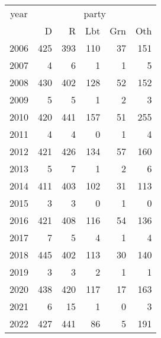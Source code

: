 \footnotesize\begin{tabular}[t]{lrrrrr}
\toprule
\multicolumn{1}{c}{year} & \multicolumn{5}{c}{party} \\
\cmidrule(l{3pt}r{3pt}){1-1} \cmidrule(l{3pt}r{3pt}){2-6}
  & D & R & Lbt & Grn & Oth\\
\midrule
2006 & 425 & 393 & 110 & 37 & 151\\
2007 & 4 & 6 & 1 & 1 & 5\\
2008 & 430 & 402 & 128 & 52 & 152\\
2009 & 5 & 5 & 1 & 2 & 3\\
2010 & 420 & 441 & 157 & 51 & 255\\
2011 & 4 & 4 & 0 & 1 & 4\\
2012 & 421 & 426 & 134 & 57 & 160\\
2013 & 5 & 7 & 1 & 2 & 6\\
2014 & 411 & 403 & 102 & 31 & 113\\
2015 & 3 & 3 & 0 & 1 & 0\\
2016 & 421 & 408 & 116 & 54 & 136\\
2017 & 7 & 5 & 4 & 1 & 4\\
2018 & 445 & 402 & 113 & 30 & 140\\
2019 & 3 & 3 & 2 & 1 & 1\\
2020 & 438 & 420 & 117 & 17 & 163\\
2021 & 6 & 15 & 1 & 0 & 3\\
2022 & 427 & 441 & 86 & 5 & 191\\
\bottomrule
\end{tabular}
